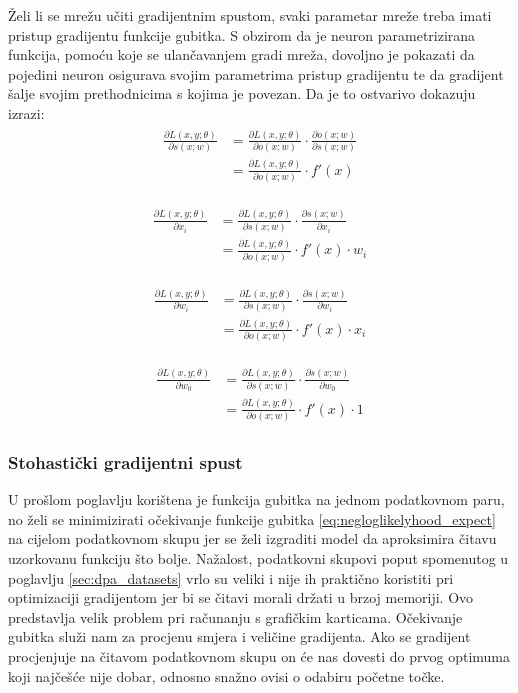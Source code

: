 \documentclass[times, utf8, numeric, diplomski]{fer}
\def\pfrac#1#2{\frac{\partial #1}{\partial #2}}
\begin{document}
Želi li se mrežu učiti gradijentnim spustom, svaki parametar mreže treba imati pristup gradijentu funkcije gubitka. S obzirom da je neuron parametrizirana funkcija, pomoću koje se ulančavanjem gradi mreža, dovoljno je pokazati da pojedini neuron osigurava svojim parametrima pristup gradijentu te da gradijent šalje svojim prethodnicima s kojima je povezan. Da je to ostvarivo dokazuju izrazi:
\begin{align}
\begin{split}
\pfrac{L(x,y;\theta)}{s(x;w)} &= \pfrac{L(x,y;\theta)}{o(x;w)} \cdot \pfrac{o(x;w)}{s(x;w)} \\
&= \pfrac{L(x,y;\theta)}{o(x;w)} \cdot f'(x)
\end{split}
\end{align}

\begin{align}
\begin{split}
\pfrac{L(x,y;\theta)}{x_i} &= \pfrac{L(x,y;\theta)}{s(x;w)} \cdot \pfrac{s(x;w)}{x_i} \\
&= \pfrac{L(x,y;\theta)}{o(x;w)} \cdot f'(x) \cdot w_i
\end{split}
\end{align}

\begin{align} \label{eq:w_update}
\begin{split}
\pfrac{L(x,y;\theta)}{w_i} &= \pfrac{L(x,y;\theta)}{s(x;w)} \cdot \pfrac{s(x;w)}{w_i} \\
&= \pfrac{L(x,y;\theta)}{o(x;w)} \cdot f'(x) \cdot x_i
\end{split}
\end{align}

\begin{align}
\begin{split}
\pfrac{L(x,y;\theta)}{w_0} &= \pfrac{L(x,y;\theta)}{s(x;w)} \cdot \pfrac{s(x;w)}{w_0} \\
&= \pfrac{L(x,y;\theta)}{o(x;w)} \cdot f'(x) \cdot 1
\end{split}
\end{align}

\subsubsection{Stohastički gradijentni spust}
U prošlom poglavlju korištena je funkcija gubitka na jednom podatkovnom paru, no želi se minimizirati očekivanje funkcije gubitka \eqref{eq:negloglikelyhood_expect} na cijelom podatkovnom skupu jer se želi izgraditi model da aproksimira čitavu uzorkovanu funkciju što bolje. Nažalost, podatkovni skupovi poput spomenutog u poglavlju \ref{sec:dpa_datasets} vrlo su veliki i nije ih praktično koristiti pri optimizaciji gradijentom jer bi se čitavi morali držati u brzoj memoriji. Ovo predstavlja velik problem pri računanju s grafičkim karticama. Očekivanje gubitka služi nam za procjenu smjera i veličine gradijenta. Ako se gradijent procjenjuje na čitavom podatkovnom skupu on će nas dovesti do prvog optimuma koji najčešće nije dobar, odnosno snažno ovisi o odabiru početne točke. 
\end{document}
